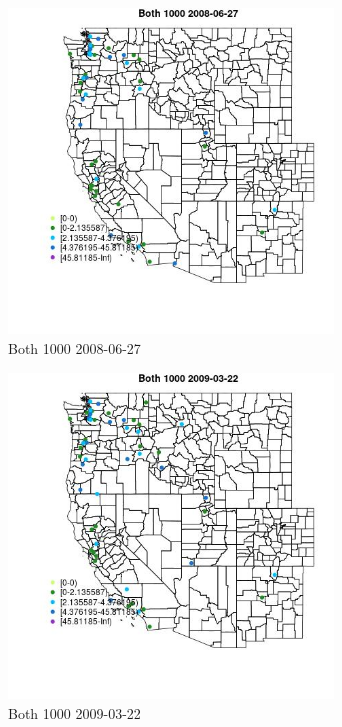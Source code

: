 \begin{figure} 
\centering  
\includegraphics[width=0.77\textwidth]{Code_Outputs/Report_ML_input_PM25_Step4_part_e_de_duplicated_aves_MapObsBoth_10002008-06-27.jpg} 
\caption{\label{fig:Report_ML_input_PM25_Step4_part_e_de_duplicated_avesMapObsBoth_10002008-06-27}Both 1000 2008-06-27} 
\end{figure} 
 

\begin{figure} 
\centering  
\includegraphics[width=0.77\textwidth]{Code_Outputs/Report_ML_input_PM25_Step4_part_e_de_duplicated_aves_MapObsBoth_10002009-03-22.jpg} 
\caption{\label{fig:Report_ML_input_PM25_Step4_part_e_de_duplicated_avesMapObsBoth_10002009-03-22}Both 1000 2009-03-22} 
\end{figure} 
 

